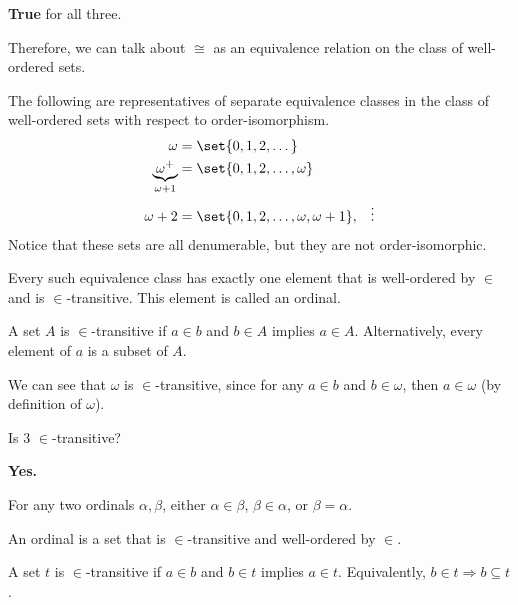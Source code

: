 \documentclass[10pt]{mypackage}
\begin{document}
\begin{answer}
  \textbf{True} for all three.
\end{answer}
Therefore, we can talk about $\cong$ as an equivalence relation on the  class of well-ordered sets.
\begin{example}
  The following are representatives of separate equivalence classes in the class of well-ordered sets with respect to order-isomorphism.
  \begin{align*}
    \omega &= \set{0,1,2,\dots}\\
    \underbrace{\omega^{+}}_{\omega + 1} &= \set{0,1,2,\dots,\omega}\\
    \omega + 2 &= \set{0,1,2,\dots,\omega,\omega + 1},
               &\vdots
  \end{align*}
  Notice that these sets are all denumerable, but they are not order-isomorphic.
\end{example}
\begin{theorem}
  Every such equivalence class has exactly one element that is well-ordered by $\in$ and is $\in$-transitive.\newline
  This element is called an ordinal.
\end{theorem}
\begin{definition}
  A set $A$ is $\in$-transitive if $a\in b$ and $b\in A$ implies $a\in A$. Alternatively, every element of $a$ is a subset of $A$.
\end{definition}
\begin{example}
  We can see that $\omega$ is $\in$-transitive, since for any $a\in b$ and $b\in \omega$, then $a\in \omega$ (by definition of $\omega$).
\end{example}
\begin{question}
  Is $3$ $\in$-transitive?
\end{question}
\begin{answer}
  \textbf{Yes.}
\end{answer}
\begin{theorem}
  For any two ordinals $\alpha,\beta$, either $\alpha \in \beta$, $\beta \in \alpha$, or $\beta = \alpha$.
\end{theorem}
\begin{recall}
  An ordinal is a set that is $\in$-transitive and well-ordered by $\in$.\newline

  A set $t$ is $\in$-transitive if $a\in b$ and $b\in t$ implies $a\in t$. Equivalently, $b\in t \Rightarrow b\subseteq t$.
\end{recall}
\end{document}
